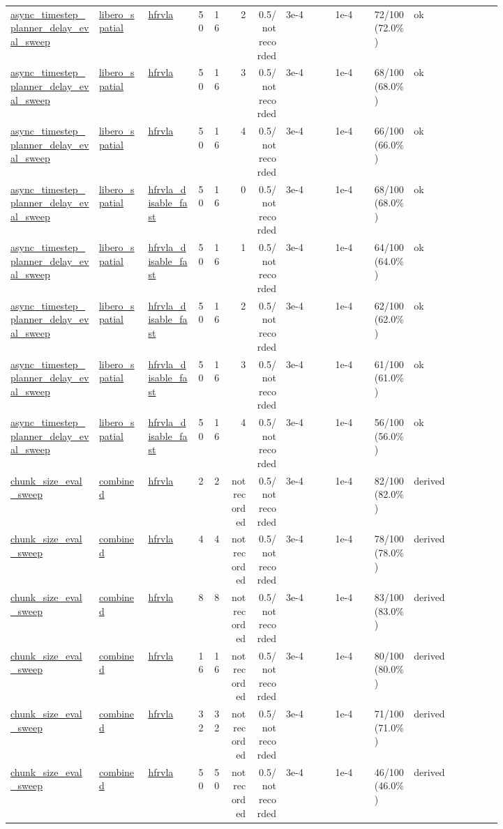 \begin{tiny}
\begin{longtable}{@{}p{0.18\linewidth}p{0.10\linewidth}p{0.10\linewidth}rrrrp{0.10\linewidth}p{0.08\linewidth}p{0.08\linewidth}p{0.11\linewidth}p{0.07\linewidth}@{}}
\url{async_timestep_planner_delay_eval_sweep} & \url{libero_spatial} & \url{hfrvla} & 50 & 16 & 2 & 0.5/not recorded & 3e-4 & 1e-4 & 72/100 (72.0\%) & ok \\
\url{async_timestep_planner_delay_eval_sweep} & \url{libero_spatial} & \url{hfrvla} & 50 & 16 & 3 & 0.5/not recorded & 3e-4 & 1e-4 & 68/100 (68.0\%) & ok \\
\url{async_timestep_planner_delay_eval_sweep} & \url{libero_spatial} & \url{hfrvla} & 50 & 16 & 4 & 0.5/not recorded & 3e-4 & 1e-4 & 66/100 (66.0\%) & ok \\
\url{async_timestep_planner_delay_eval_sweep} & \url{libero_spatial} & \url{hfrvla_disable_fast} & 50 & 16 & 0 & 0.5/not recorded & 3e-4 & 1e-4 & 68/100 (68.0\%) & ok \\
\url{async_timestep_planner_delay_eval_sweep} & \url{libero_spatial} & \url{hfrvla_disable_fast} & 50 & 16 & 1 & 0.5/not recorded & 3e-4 & 1e-4 & 64/100 (64.0\%) & ok \\
\url{async_timestep_planner_delay_eval_sweep} & \url{libero_spatial} & \url{hfrvla_disable_fast} & 50 & 16 & 2 & 0.5/not recorded & 3e-4 & 1e-4 & 62/100 (62.0\%) & ok \\
\url{async_timestep_planner_delay_eval_sweep} & \url{libero_spatial} & \url{hfrvla_disable_fast} & 50 & 16 & 3 & 0.5/not recorded & 3e-4 & 1e-4 & 61/100 (61.0\%) & ok \\
\url{async_timestep_planner_delay_eval_sweep} & \url{libero_spatial} & \url{hfrvla_disable_fast} & 50 & 16 & 4 & 0.5/not recorded & 3e-4 & 1e-4 & 56/100 (56.0\%) & ok \\
\url{chunk_size_eval_sweep} & \url{combined} & \url{hfrvla} & 2 & 2 & not recorded & 0.5/not recorded & 3e-4 & 1e-4 & 82/100 (82.0\%) & derived \\
\url{chunk_size_eval_sweep} & \url{combined} & \url{hfrvla} & 4 & 4 & not recorded & 0.5/not recorded & 3e-4 & 1e-4 & 78/100 (78.0\%) & derived \\
\url{chunk_size_eval_sweep} & \url{combined} & \url{hfrvla} & 8 & 8 & not recorded & 0.5/not recorded & 3e-4 & 1e-4 & 83/100 (83.0\%) & derived \\
\url{chunk_size_eval_sweep} & \url{combined} & \url{hfrvla} & 16 & 16 & not recorded & 0.5/not recorded & 3e-4 & 1e-4 & 80/100 (80.0\%) & derived \\
\url{chunk_size_eval_sweep} & \url{combined} & \url{hfrvla} & 32 & 32 & not recorded & 0.5/not recorded & 3e-4 & 1e-4 & 71/100 (71.0\%) & derived \\
\url{chunk_size_eval_sweep} & \url{combined} & \url{hfrvla} & 50 & 50 & not recorded & 0.5/not recorded & 3e-4 & 1e-4 & 46/100 (46.0\%) & derived \\

\end{longtable}
\end{tiny}
